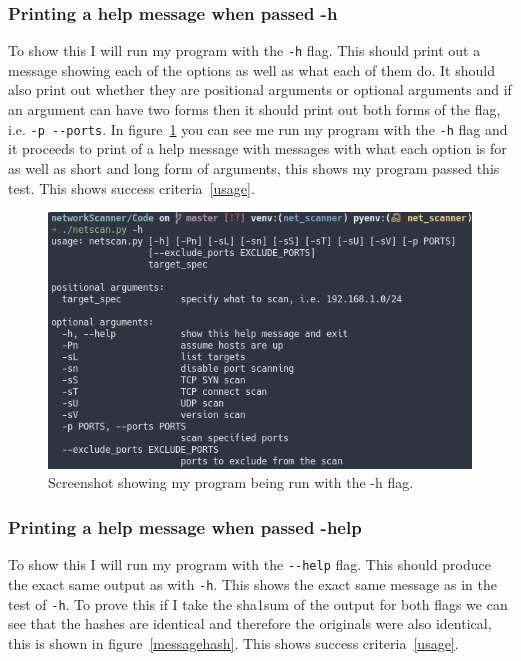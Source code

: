 \documentclass[titlepage]{article}
\let\Oldsubsubsection\subsubsection{}
\renewcommand{\subsubsection}{\FloatBarrier\Oldsubsubsection}
\begin{document}
\subsubsection{Printing a help message when passed -h}

To show this I will run my program with the \verb|-h| flag.
This should print out a message showing each of the options as well as what each of them do.
It should also print out whether they are positional arguments or optional arguments and if
an argument can have two forms then it should print out both forms of the flag, i.e. \verb|-p --ports|.
In figure~\ref{hflagtest} you can see me run my program with the \verb|-h| flag and it proceeds to
print of a help message with messages with what each option is for as well as short and long form of
arguments, this shows my program passed this test.
This shows success criteria~\ref{usage}.

\begin{figure}[H]
  \centering
  \includegraphics[width=\textwidth]{hmessage.png}
  \caption{%
    Screenshot showing my program being run with the -h flag.
  }\label{hflagtest}
\end{figure}

\subsubsection{Printing a help message when passed -help}
To show this I will run my program with the \verb|--help| flag.
This should produce the exact same output as with \verb|-h|.
This shows the exact same message as in the test of \verb|-h|.
To prove this if I take the sha1sum of the output for both flags we can see
that the hashes are identical and therefore the originals were also identical,
this is shown in figure~\ref{messagehash}.
This shows success criteria~\ref{usage}.
\end{document}
